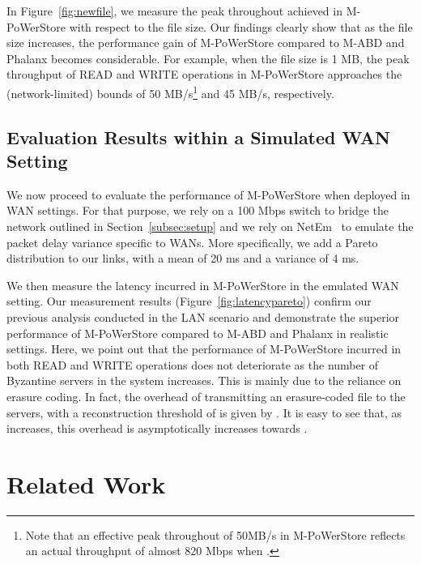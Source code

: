 \documentclass[10pt,conference,compsocconf]{IEEEtran}
\newcommand{\mprotocol}{M-PoWerStore}
\begin{document}
In Figure~\ref{fig:newfile}, we measure the peak throughout achieved in \mprotocol{} with respect to the file size. Our findings clearly show that as the file size increases, the performance gain of \mprotocol{} compared to M-ABD and Phalanx becomes considerable. For example, when the file size is 1 MB, the peak throughput of \textsc{READ} and \textsc{WRITE} operations in \mprotocol{} approaches the (network-limited) bounds of 50 MB/s\footnote{Note that an effective peak throughout of 50MB/s in \mprotocol{} reflects an actual throughput of almost 820 Mbps when .} and 45 MB/s, respectively.



\subsection{Evaluation Results within a Simulated WAN Setting}\label{subsec:wan}

We now proceed to evaluate the  performance of \mprotocol{} when deployed in WAN settings. For that purpose, we rely on a 100 Mbps switch to bridge the network outlined in Section~\ref{subsec:setup} and
we rely on NetEm~\cite{netem} to emulate the packet delay variance specific to WANs. More specifically, we add a Pareto distribution to our links, with a mean of 20 ms and a variance of 4 ms.

We then measure the latency incurred in \mprotocol{} in the emulated WAN setting. Our measurement results (Figure~\ref{fig:latencypareto}) confirm our previous analysis conducted in the LAN scenario and demonstrate the superior performance of \mprotocol{} compared to M-ABD and Phalanx in realistic settings. Here, we point out that the performance of \mprotocol{} incurred in both \textsc{READ} and \textsc{WRITE} operations does not deteriorate as the number of Byzantine servers in the system increases. This is mainly due to the reliance on erasure coding. In fact, the overhead of transmitting an erasure-coded file  to the  servers, with a reconstruction threshold
of  is given by . It is easy to see that, as  increases, this overhead is asymptotically increases towards .



\section{Related Work}\label{sec:relwork}
\end{document}
